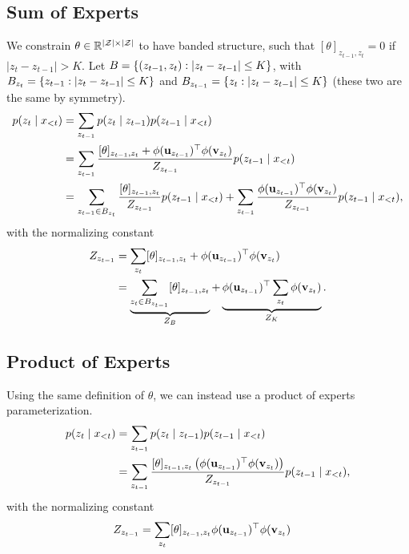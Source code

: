 \documentclass{article}
\begin{document}
\subsection{Sum of Experts}
We constrain $\theta\in\mathbb{R}^{|\mathcal{Z}|\times|\mathcal{Z}|}$ to have banded structure,
such that $[\theta]_{z_{t-1},z_t} = 0$ if $|z_t - z_{t-1}| > K$.
Let $B = \left\{(z_{t-1}, z_t): |z_t - z_{t-1}| \le K\right\}$,
with $B_{z_{t}} = \left\{z_{t-1}: |z_t - z_{t-1}| \le K\right\}$
and $B_{z_{t-1}} = \left\{z_t: |z_t - z_{t-1}| \le K\right\}$
(these two are the same by symmetry).
\begin{equation}
\begin{aligned}
p(z_t \mid x_{<t})
&= \sum_{z_{t-1}}p(z_t \mid z_{t-1})p(z_{t-1} \mid x_{<t})\\
&= \sum_{z_{t-1}}
    \frac{[\theta]_{z_{t-1},z_{t}} + \phi(\mathbf{u}_{z_{t-1}})^\top \phi(\mathbf{v}_{z_{t}})}
    {Z_{z_{t-1}}} p(z_{t-1} \mid x_{<t})\\
&= \sum_{z_{t-1}\in B_{z_t}}
    \frac{[\theta]_{z_{t-1},z_{t}}}
    {Z_{z_{t-1}}} p(z_{t-1} \mid x_{<t})
+ \sum_{z_{t-1}} \frac{\phi(\mathbf{u}_{z_{t-1}})^\top \phi(\mathbf{v}_{z_{t}})}
    {Z_{z_{t-1}}} p(z_{t-1} \mid x_{<t}),
\end{aligned}
\end{equation}
with the normalizing constant
\begin{equation}
\begin{aligned}
Z_{z_{t-1}}
&= \sum_{z_{t}} [\theta]_{z_{t-1},z_{t}} + \phi(\mathbf{u}_{z_{t-1}})^\top \phi(\mathbf{v}_{z_{t}})\\
&= \underbrace{\sum_{z_{t}\in B_{z_{t-1}}} [\theta]_{z_{t-1},z_{t}}}_{Z_B} + 
    \underbrace{\phi(\mathbf{u}_{z_{t-1}})^\top \sum_{z_t} \phi(\mathbf{v}_{z_{t}})}_{Z_K}.
\end{aligned}
\end{equation}

\subsection{Product of Experts}
Using the same definition of $\theta$, we can instead use a product of experts parameterization.
\begin{equation}
\begin{aligned}
p(z_t \mid x_{<t})
&= \sum_{z_{t-1}}p(z_t \mid z_{t-1})p(z_{t-1} \mid x_{<t})\\
&= \sum_{z_{t-1}}
    \frac{[\theta]_{z_{t-1},z_{t}} \left(\phi(\mathbf{u}_{z_{t-1}})^\top \phi(\mathbf{v}_{z_{t}})\right)}
    {Z_{z_{t-1}}} p(z_{t-1} \mid x_{<t}),
\end{aligned}
\end{equation}
with the normalizing constant
\begin{equation}
\begin{aligned}
Z_{z_{t-1}}
&= \sum_{z_{t}} [\theta]_{z_{t-1},z_{t}} \phi(\mathbf{u}_{z_{t-1}})^\top \phi(\mathbf{v}_{z_{t}})
\end{aligned}
\end{equation}
\end{document}
